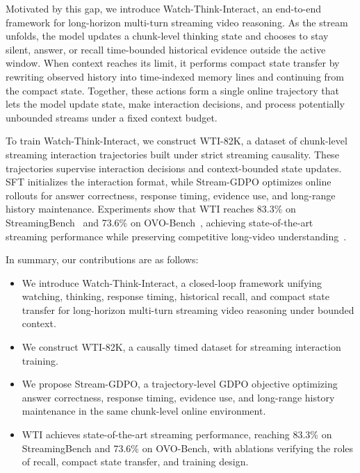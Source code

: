 Motivated by this gap, we introduce Watch-Think-Interact, an end-to-end framework for long-horizon multi-turn streaming video reasoning.
As the stream unfolds, the model updates a chunk-level thinking state and chooses to stay silent, answer, or recall time-bounded historical evidence outside the active window.
When context reaches its limit, it performs compact state transfer by rewriting observed history into time-indexed memory lines and continuing from the compact state.
Together, these actions form a single online trajectory that lets the model update state, make interaction decisions, and process potentially unbounded streams under a fixed context budget.

To train Watch-Think-Interact, we construct WTI-82K, a dataset of chunk-level streaming interaction trajectories built under strict streaming causality.
These trajectories supervise interaction decisions and context-bounded state updates.
SFT initializes the interaction format, while Stream-GDPO optimizes online rollouts for answer correctness, response timing, evidence use, and long-range history maintenance.
Experiments show that WTI reaches 83.3\% on StreamingBench~\citep{streamingbench2024} and 73.6\% on OVO-Bench~\citep{ovobench2025}, achieving state-of-the-art streaming performance while preserving competitive long-video understanding~\citep{longvideobench2024}.

In summary, our contributions are as follows:
\begin{itemize}[leftmargin=*, itemsep=1pt, topsep=1pt, parsep=1pt, partopsep=1pt]
  \item We introduce Watch-Think-Interact, a closed-loop framework unifying watching, thinking, response timing, historical recall, and compact state transfer for long-horizon multi-turn streaming video reasoning under bounded context.
  \item We construct WTI-82K, a causally timed dataset for streaming interaction training.
  \item We propose Stream-GDPO, a trajectory-level GDPO objective optimizing answer correctness, response timing, evidence use, and long-range history maintenance in the same chunk-level online environment.
  \item WTI achieves state-of-the-art streaming performance, reaching 83.3\% on StreamingBench and 73.6\% on OVO-Bench, with ablations verifying the roles of recall, compact state transfer, and training design.
\end{itemize}
